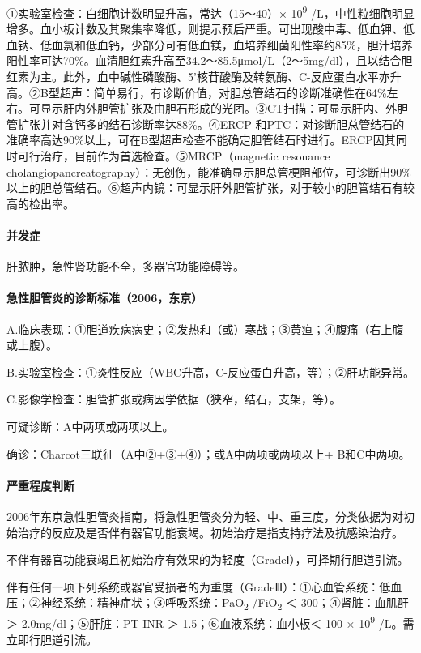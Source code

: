 ①实验室检查：白细胞计数明显升高，常达（15～40）× 10\textsuperscript{9}
/L，中性粒细胞明显增多。血小板计数及其聚集率降低，则提示预后严重。可出现酸中毒、低血钾、低血钠、低血氯和低血钙，少部分可有低血镁，血培养细菌阳性率约85\%，胆汁培养阳性率可达70\%。血清胆红素升高至34.2～85.5μmol/L（2～5mg/dl），且以结合胆红素为主。此外，血中碱性磷酸酶、5'核苷酸酶及转氨酶、C-反应蛋白水平亦升高。②B型超声：简单易行，有诊断价值，对胆总管结石的诊断准确性在64\%左右。可显示肝内外胆管扩张及由胆石形成的光团。③CT扫描：可显示肝内、外胆管扩张并对含钙多的结石诊断率达88\%。④ERCP
和PTC：对诊断胆总管结石的准确率高达90\%以上，可在B型超声检查不能确定胆管结石时进行。ERCP因其同时可行治疗，目前作为首选检查。⑤MRCP（magnetic
resonance
cholangiopancreatography）：无创伤，能准确显示胆总管梗阻部位，可诊断出90\%以上的胆总管结石。⑥超声内镜：可显示肝外胆管扩张，对于较小的胆管结石有较高的检出率。

\paragraph{并发症}

肝脓肿，急性肾功能不全，多器官功能障碍等。

\paragraph{急性胆管炎的诊断标准（2006，东京）}

A.临床表现：①胆道疾病病史；②发热和（或）寒战；③黄疸；④腹痛（右上腹或上腹）。

B.实验室检查：①炎性反应（WBC升高，C-反应蛋白升高，等）；②肝功能异常。

C.影像学检查：胆管扩张或病因学依据（狭窄，结石，支架，等）。

可疑诊断：A中两项或两项以上。

确诊：Charcot三联征（A中②+③+④）；或A中两项或两项以上+ B和C中两项。

\paragraph{严重程度判断}

2006年东京急性胆管炎指南，将急性胆管炎分为轻、中、重三度，分类依据为对初始治疗的反应及是否伴有器官功能衰竭。初始治疗是指支持疗法及抗感染治疗。

不伴有器官功能衰竭且初始治疗有效果的为轻度（GradeⅠ），可择期行胆道引流。

伴有任何一项下列系统或器官受损者的为重度（GradeⅢ）：①心血管系统：低血压；②神经系统：精神症状；③呼吸系统：PaO\textsubscript{2}
/FiO\textsubscript{2} ＜ 300；④肾脏：血肌酐＞ 2.0mg/dl；⑤肝脏：PT-INR ＞
1.5；⑥血液系统：血小板＜ 100 × 10\textsuperscript{9}
/L。需立即行胆道引流。


